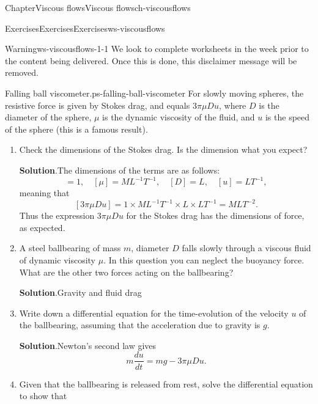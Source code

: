 \documentclass[oneside,10pt,]{book}
\newcommand{\blocktitlefont}{\relax}
\numberwithin{equation}{section}
\begin{document}
\begin{chapterptx}{Chapter}{Viscous flows}{}{Viscous flows}{}{}{ch-viscousflows}
\begin{exercises-section}{Exercises}{Exercises}{}{Exercises}{}{}{ws-viscousflows}
\begin{introduction}{}
\begin{warning}{Warning}{}{ws-viscousflows-1-1}
We look to complete worksheets in the week prior to the content being delivered. Once this is done, this disclaimer message will be removed.%
\end{warning}
\end{introduction}%
\begin{divisionexercise}{1}{Falling ball viscometer.}{}{ps-falling-ball-viscometer}%
For slowly moving spheres, the resistive force is given by Stokes drag, and equals \(3\pi\mu Du\), where \(D\) is the diameter of the sphere, \(\mu\) is the dynamic viscosity of the fluid, and \(u\) is the speed of the sphere (this is a famous result).%
\begin{enumerate}[font=\bfseries,label=(\alph*),ref=\alph*]%
\item{}Check the dimensions of the Stokes drag. Is the dimension what you expect?%
\par\smallskip%
\noindent\textbf{\blocktitlefont Solution}.\hypertarget{ps-falling-ball-viscometer-3-2}{}\quad{}The dimensions of the terms are as follows:%
\begin{equation*}
[3\pi]=1,\quad
[\mu]=ML^{-1}T^{-1},\quad
[D]=L,\quad
[u]=LT^{-1},
\end{equation*}
meaning that%
\begin{equation*}
\left[3\pi\mu Du\right]=1\times ML^{-1}T^{-1}\times L\times LT^{-1}
=MLT^{-2}.
\end{equation*}
Thus the expression \(3\pi\mu Du\) for the Stokes drag has the dimensions of force, as expected.%
\item{}A steel ballbearing of mass \(m\), diameter \(D\) falls slowly through a viscous fluid of dynamic viscosity \(\mu\). In this question you can neglect the buoyancy force. What are the other two forces acting on the ballbearing?%
\par\smallskip%
\noindent\textbf{\blocktitlefont Solution}.\hypertarget{ps-falling-ball-viscometer-4-2}{}\quad{}Gravity and fluid drag%
\item{}Write down a differential equation for the time-evolution of the velocity \(u\) of the ballbearing, assuming that the acceleration due to gravity is \(g\).%
\par\smallskip%
\noindent\textbf{\blocktitlefont Solution}.\hypertarget{ps-falling-ball-viscometer-5-2}{}\quad{}Newton's second law gives%
\begin{equation*}
m\frac{du}{dt}=mg-3\pi\mu Du.
\end{equation*}
%
\item{}Given that the ballbearing is released from rest, solve the differential equation to show that%

\end{enumerate}
\end{divisionexercise}
\end{exercises-section}
\end{chapterptx}
\end{document}
